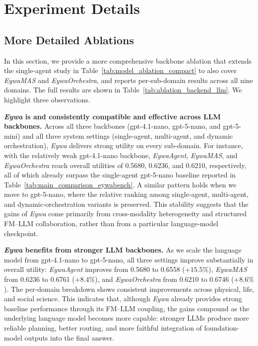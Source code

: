 \section{Experiment Details}
\label{app:experiment_details}


\subsection{More Detailed Ablations}
\label{ap:more_ablation}



In this section, we provide a more comprehensive backbone ablation that extends the single-agent study in Table~\ref{tab:model_ablation_compact} to also cover \textit{EywaMAS} and \textit{EywaOrchestra}, and reports per-sub-domain results across all nine domains. The full results are shown in Table~\ref{tab:ablation_backend_llm}. We highlight three observations.
 
\textbf{\textit{Eywa} is and consistently compatible and effective across LLM backbones.} Across all three backbones (gpt-4.1-nano, gpt-5-nano, and gpt-5-mini) and all three system settings (single-agent, multi-agent, and dynamic orchestration), \textit{Eywa} delivers strong utility on every sub-domain. For instance, with the relatively weak gpt-4.1-nano backbone, \textit{EywaAgent}, \textit{EywaMAS}, and \textit{EywaOrchestra} reach overall utilities of 0.5680, 0.6236, and 0.6210, respectively, all of which already surpass the single-agent gpt-5-nano baseline reported in Table~\ref{tab:main_comparison_eywabench}. A similar pattern holds when we move to gpt-5-nano, where the relative ranking among single-agent, multi-agent, and dynamic-orchestration variants is preserved. This stability suggests that the gains of \textit{Eywa} come primarily from cross-modality heterogeneity and structured FM--LLM collaboration, rather than from a particular language-model checkpoint.
 
\textbf{\textit{Eywa} benefits from stronger LLM backbones.} As we scale the language model from gpt-4.1-nano to gpt-5-nano, all three settings improve substantially in overall utility: \textit{EywaAgent} improves from 0.5680 to 0.6558 ($+15.5\%$), \textit{EywaMAS} from 0.6236 to 0.6761 ($+8.4\%$), and \textit{EywaOrchestra} from 0.6210 to 0.6746 ($+8.6\%$). The per-domain breakdown shows consistent improvements across physical, life, and social science. This indicates that, although \textit{Eywa} already provides strong baseline performance through its FM--LLM coupling, the gains compound as the underlying language model becomes more capable: stronger LLMs produce more reliable planning, better routing, and more faithful integration of foundation-model outputs into the final answer.
 
